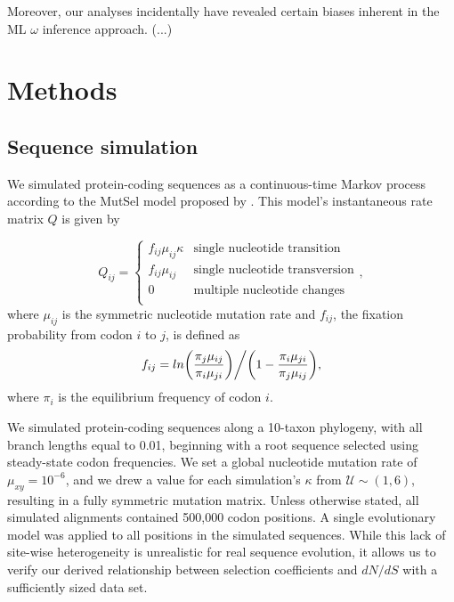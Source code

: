 \documentclass[11pt]{article}
\begin{document}
Moreover, our analyses incidentally have revealed certain biases inherent in the ML $\omega$ inference approach. (...)
 


\section*{Methods}

\subsection*{Sequence simulation}
We simulated protein-coding sequences as a continuous-time Markov
process \cite{Yang2006} according to the MutSel model proposed by \cite{HalpernBruno1998}. This model's instantaneous rate matrix $Q$ is given by 

\begin{equation}
Q_{ij} = \left\{ \begin{array}{rl}
              f_{ij}\mu_{ij}\kappa               &\mbox{single nucleotide transition} \\
              f_{ij}\mu_{ij}                          &\mbox{single nucleotide transversion} \\
              0                                           &\mbox{multiple nucleotide changes} \\             
         \end{array} \right.,
\end{equation} where $\mu_{ij}$ is the symmetric nucleotide mutation rate and $f_{ij}$, the fixation probability from codon $i$ to $j$, is defined as \begin{equation}f_{ij} = ln\bigg{(}\frac{\pi_j\mu_{ij}}{\pi_i\mu_{ji}}\bigg{)}\bigg{/}\bigg{(}1 - \frac{\pi_i\mu_{ji}}{\pi_j\mu_{ij}}\bigg{)},\end{equation} where $\pi_i$ is the equilibrium frequency of codon $i$.

We simulated protein-coding sequences along a 10-taxon phylogeny, with all branch lengths equal to 0.01, beginning with a root sequence selected using steady-state codon frequencies. We set a global nucleotide mutation rate of $\mu_{xy} = 10^{-6}$, and we drew a value for each simulation's $\kappa$ from $\mathcal{U} \sim (1,6)$, resulting in a fully symmetric mutation matrix. Unless otherwise stated, all simulated alignments contained 500,000 codon positions. A single evolutionary model was applied to all positions in the simulated sequences. While this lack of site-wise heterogeneity is unrealistic for real sequence evolution, it allows us to verify our derived relationship between selection coefficients and $dN/dS$ with a sufficiently sized data set.
\end{document}

